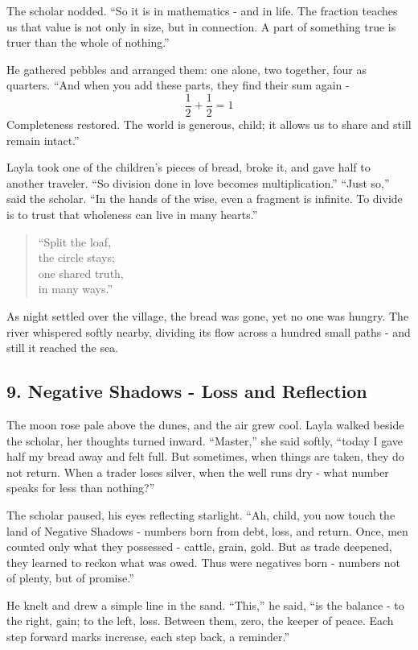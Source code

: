 \documentclass[
  letterpaper,
  DIV=11,
  numbers=noendperiod]{scrreprt}
\begin{document}
The scholar nodded. ``So it is in mathematics - and in life. The
fraction teaches us that value is not only in size, but in connection. A
part of something true is truer than the whole of nothing.''

He gathered pebbles and arranged them: one alone, two together, four as
quarters. ``And when you add these parts, they find their sum again - \[
\frac{1}{2} + \frac{1}{2} = 1
\] Completeness restored. The world is generous, child; it allows us to
share and still remain intact.''

Layla took one of the children's pieces of bread, broke it, and gave
half to another traveler. ``So division done in love becomes
multiplication.'' ``Just so,'' said the scholar. ``In the hands of the
wise, even a fragment is infinite. To divide is to trust that wholeness
can live in many hearts.''

\begin{quote}
``Split the loaf,\\
the circle stays;\\
one shared truth,\\
in many ways.''
\end{quote}

As night settled over the village, the bread was gone, yet no one was
hungry. The river whispered softly nearby, dividing its flow across a
hundred small paths - and still it reached the sea.

\subsection{9. Negative Shadows - Loss and
Reflection}\label{negative-shadows---loss-and-reflection}

The moon rose pale above the dunes, and the air grew cool. Layla walked
beside the scholar, her thoughts turned inward. ``Master,'' she said
softly, ``today I gave half my bread away and felt full. But sometimes,
when things are taken, they do not return. When a trader loses silver,
when the well runs dry - what number speaks for less than nothing?''

The scholar paused, his eyes reflecting starlight. ``Ah, child, you now
touch the land of Negative Shadows - numbers born from debt, loss, and
return. Once, men counted only what they possessed - cattle, grain,
gold. But as trade deepened, they learned to reckon what was owed. Thus
were negatives born - numbers not of plenty, but of promise.''

He knelt and drew a simple line in the sand. ``This,'' he said, ``is the
balance - to the right, gain; to the left, loss. Between them, zero, the
keeper of peace. Each step forward marks increase, each step back, a
reminder.''
\end{document}
